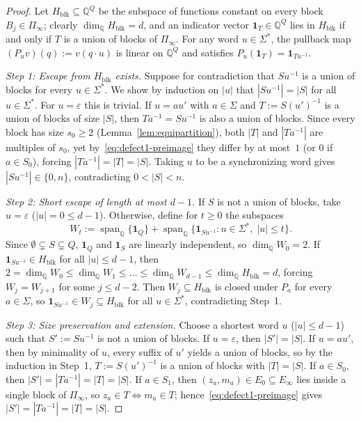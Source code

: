 \documentclass[11pt,a4paper]{article}
\theoremstyle{definition}
\theoremstyle{remark}
\newcommand{\spanQ}{\operatorname{span}_{\mathbb{Q}}}
\newcommand{\one}{\mathbf{1}}
\begin{document}
\begin{proof}
Let $H_{\mathrm{blk}} \subseteq \mathbb{Q}^Q$ be the subspace of functions constant on every block $B_j \in \Pi_\infty$; clearly $\dim_{\mathbb{Q}} H_{\mathrm{blk}} = d$, and an indicator vector $\one_T \in \mathbb{Q}^Q$ lies in $H_{\mathrm{blk}}$ if and only if $T$ is a union of blocks of $\Pi_\infty$. For any word $u \in \Sigma^*$, the pullback map $(P_u v)(q) := v(q \cdot u)$ is linear on $\mathbb{Q}^Q$ and satisfies $P_u(\one_T) = \one_{T u^{-1}}$.

\emph{Step 1: Escape from $H_{\mathrm{blk}}$ exists.} Suppose for contradiction that $S u^{-1}$ is a union of blocks for every $u \in \Sigma^*$. We show by induction on $|u|$ that $|S u^{-1}| = |S|$ for all $u \in \Sigma^*$. For $u = \varepsilon$ this is trivial. If $u = a u'$ with $a \in \Sigma$ and $T := S (u')^{-1}$ is a union of blocks of size $|S|$, then $T a^{-1} = S u^{-1}$ is also a union of blocks. Since every block has size $s_0 \ge 2$ (Lemma~\ref{lem:equipartition}), both $|T|$ and $|T a^{-1}|$ are multiples of $s_0$, yet by~\eqref{eq:defect1-preimage} they differ by at most~$1$ (or $0$ if $a \in S_0$), forcing $|T a^{-1}| = |T| = |S|$. Taking $u$ to be a synchronizing word gives $|S u^{-1}| \in \{0, n\}$, contradicting $0 < |S| < n$.

\emph{Step 2: Short escape of length at most $d - 1$.} If $S$ is not a union of blocks, take $u = \varepsilon$ ($|u| = 0 \le d - 1$). Otherwise, define for $t \ge 0$ the subspaces
\[
  W_t := \spanQ\{\one_Q\} + \spanQ\{\one_{S u^{-1}} : u \in \Sigma^*,\; |u| \le t\}.
\]
Since $\emptyset \subsetneq S \subsetneq Q$, $\one_Q$ and $\one_S$ are linearly independent, so $\dim_{\mathbb{Q}} W_0 = 2$. If $\one_{S u^{-1}} \in H_{\mathrm{blk}}$ for all $|u| \le d - 1$, then $2 = \dim_{\mathbb{Q}} W_0 \le \dim_{\mathbb{Q}} W_1 \le \dots \le \dim_{\mathbb{Q}} W_{d-1} \le \dim_{\mathbb{Q}} H_{\mathrm{blk}} = d$, forcing $W_j = W_{j+1}$ for some $j \le d - 2$. Then $W_j \subseteq H_{\mathrm{blk}}$ is closed under $P_a$ for every $a \in \Sigma$, so $\one_{S u^{-1}} \in W_j \subseteq H_{\mathrm{blk}}$ for all $u \in \Sigma^*$, contradicting Step~1.

\emph{Step 3: Size preservation and extension.} Choose a shortest word $u$ ($|u| \le d - 1$) such that $S' := S u^{-1}$ is not a union of blocks. If $u = \varepsilon$, then $|S'| = |S|$. If $u = a u'$, then by minimality of $u$, every suffix of $u'$ yields a union of blocks, so by the induction in Step~1, $T := S (u')^{-1}$ is a union of blocks with $|T| = |S|$. If $a \in S_0$, then $|S'| = |T a^{-1}| = |T| = |S|$. If $a \in S_1$, then $(z_a, m_a) \in E_0 \subseteq E_\infty$ lies inside a single block of $\Pi_\infty$, so $z_a \in T \iff m_a \in T$; hence~\eqref{eq:defect1-preimage} gives $|S'| = |T a^{-1}| = |T| = |S|$.


\end{proof}
\end{document}
